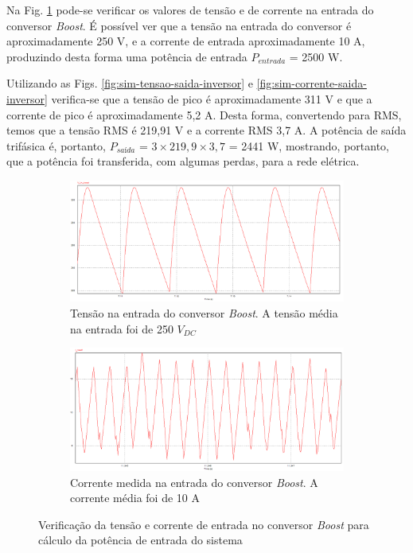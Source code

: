 Na Fig. \ref{fig:sim-tensao-corrente-boost} pode-se verificar os valores de tensão e de corrente na entrada do conversor \textit{Boost}.
É possível ver que a tensão na entrada do conversor é aproximadamente 250 V, e a corrente de entrada aproximadamente 10 A, produzindo desta forma uma potência de entrada $P_{entrada}$ = 2500 W.

Utilizando as Figs. \ref{fig:sim-tensao-saida-inversor} e \ref{fig:sim-corrente-saida-inversor} verifica-se que a tensão de pico é aproximadamente 311 V e que a corrente de pico é aproximadamente 5,2 A.
Desta forma, convertendo para RMS, temos que a tensão RMS é 219,91 V e a corrente RMS 3,7 A. A potência de saída trifásica é, portanto, $P_{saída}$ = $ 3 \times 219,9 \times 3,7$ = 2441 W, mostrando, portanto, que a potência foi transferida, com algumas perdas, para a rede elétrica.

\begin{figure}[!hbt]
	\centering
	\begin{subfigure}[b]{0.5\textwidth}
		\centering
		\includegraphics[width=\textwidth]{figuras/sim_figures/sistema_completo/tensao_entrada_boost_2.PNG}
		\caption{Tensão na entrada do conversor \textit{Boost}. A tensão média na entrada foi de 250 $V_{DC}$}
	\end{subfigure}
	
	\begin{subfigure}[b]{0.5\textwidth}
		\centering
		\includegraphics[width=\textwidth]{figuras/sim_figures/sistema_completo/corrente_entrada_boost_2.PNG}
		\caption{Corrente medida na entrada do conversor \textit{Boost}. A corrente média foi de 10 A}
	\end{subfigure}

	\caption{Verificação da tensão e corrente de entrada no conversor \textit{Boost} para cálculo da potência de entrada do sistema}
    \label{fig:sim-tensao-corrente-boost}
\end{figure}

